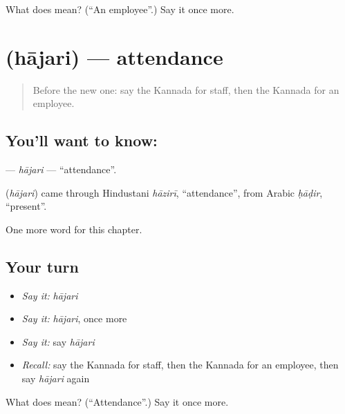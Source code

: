 \begin{tcolorbox}[breakable,colback=teal!4,colframe=teal!35!black,title={Before you move on}]
What does  mean? (\textquotedblleft{}An employee\textquotedblright{}.) Say it once more.
\end{tcolorbox}
\section[\texorpdfstring{\kn{ಹಾಜರಿ} (hājari)}{ಹಾಜರಿ (hājari)}]{ (hājari) — attendance}

\label{lesson:KA-C234-hajari}



\begin{quote}
Before the new one: say the Kannada for staff, then the Kannada for an employee.
\end{quote}

\subsection*{You'll want to know: }
\textbf{} — \emph{hājari} — \textquotedblleft{}attendance\textquotedblright{}.

\begin{cousinweb}
\textbf{} (\emph{hājari}) came through Hindustani \emph{hāzirī}, \textquotedblleft{}attendance\textquotedblright{}, from Arabic \emph{ḥāḍir}, \textquotedblleft{}present\textquotedblright{}.
\end{cousinweb}

\begin{grammarlens}[title={What you've built}]
One more word for this chapter.
\end{grammarlens}

\subsection*{Your turn}
\begin{itemize}
\raggedright
  \item \emph{Say it:} \emph{hājari}
  \item \emph{Say it:} \emph{hājari}, once more
  \item \emph{Say it:} say \emph{hājari}
  \item \emph{Recall:} say the Kannada for staff, then the Kannada for an employee, then say \emph{hājari} again
\end{itemize}

\begin{tcolorbox}[breakable,colback=teal!4,colframe=teal!35!black,title={Before you move on}]
What does  mean? (\textquotedblleft{}Attendance\textquotedblright{}.) Say it once more.
\end{tcolorbox}
